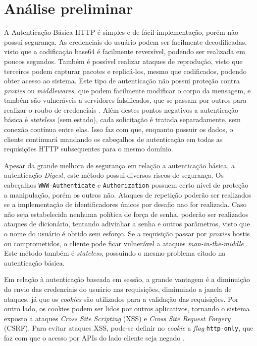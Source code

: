 \section{Análise preliminar}

A Autenticação Básica HTTP é simples e de fácil implementação, porém não possui segurança. As 
credenciais do usuário podem ser facilmente decodificadas, visto que a codificação base64 é 
facilmente reversível, podendo ser realizada em poucos segundos. Também é possível realizar ataques 
de reprodução, visto que terceiros podem capturar pacotes e replicá-los, mesmo que codificados, 
podendo obter acesso ao sistema. Este tipo de autenticação não possui proteção contra \emph{proxies} 
ou \emph{middlewares}, que podem facilmente modificar o corpo da mensagem, e também são vulneráveis 
a servidores falsificados, que se passam por outros para realizar o roubo de credenciais 
\cite{GOURLEY2002}. Além destes pontos negativos a autenticação básica é \emph{stateless} (sem 
estado), cada solicitação é tratada separadamente, sem conexão contínua entre elas. Isso faz com 
que, enquanto possuir os dados, o cliente continuará mandando os cabeçalhos de autenticação em 
todas as requisições HTTP subsequentes para o mesmo domínio.

Apesar da grande melhora de segurança em relação a autenticação básica, a autenticação 
\emph{Digest}, este método possui diversos riscos de segurança. Os cabeçalhos 
\texttt{WWW-Authenticate} e \texttt{Authorization} possuem certo nível de proteção a manipulação, 
porém os outros não. Ataques de repetição poderão ser realizados se a implementação de 
identificadores únicos por desafio nao for realizada. Caso não seja estabelecida nenhuma política de 
força de senha, poderão ser realizados ataques de dicionário, tentando adivinhar a senha e outros 
parâmetros, visto que o nome do usuário é obtido sem esforço. Se a requisição passar por 
\emph{proxies} hostis ou comprometidos, o cliente pode ficar vulnerável a ataques 
\emph{man-in-the-middle} \cite{GOURLEY2002}. Este método também é \emph{stateless}, possuindo o 
mesmo problema citado na autenticação básica.

Em relação à autenticação baseada em sessão, a grande vantagem é a diminuição do envio das 
credenciais do usuário nas requisições, diminuindo a janela de ataques, já que os \emph{cookies} 
são utilizados para a validação das requisições. Por outro lado, os cookies podem ser lidos por 
outros aplicativos, tornando o sistema exposto a ataques \emph{Cross Site Scripting} (XSS) e 
\emph{Cross Site Request Forgery} (CSRF). Para evitar ataques XSS, pode-se definir no \emph{cookie} 
a \emph{flag} \texttt{http-only}, que faz com que o acesso por APIs do lado cliente seja negado 
\cite{PAPATHANASAKI2022}.


